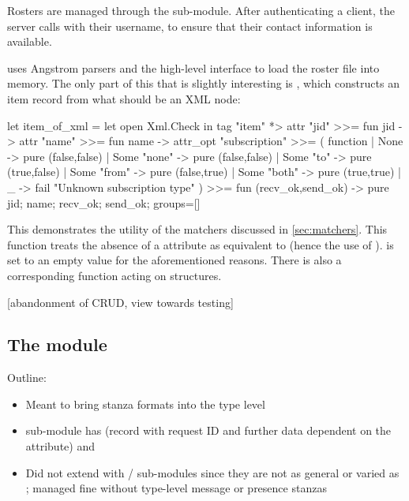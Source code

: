 \documentclass[12pt,a4paper,twoside,openright]{report}
\begin{document}
{Rosters are managed through the  sub-module. After authenticating a client, the server calls  with their username, to ensure that their contact information is available.

 uses Angstrom parsers and the high-level  interface to load the roster file into memory. The only part of this that is slightly interesting is , which constructs an item record from what should be an  XML node:

\begin{ocaml}
let item_of_xml =
  let open Xml.Check in
  tag "item" *> attr "jid" >>= fun jid ->
    attr "name" >>= fun name ->
      attr_opt "subscription" >>= ( function
      | None        -> pure (false,false)
      | Some "none" -> pure (false,false)
      | Some "to"   -> pure (true,false)
      | Some "from" -> pure (false,true)
      | Some "both" -> pure (true,true)
      | _ -> fail "Unknown subscription type" ) >>=
  fun (recv_ok,send_ok) ->
    pure { jid; name; recv_ok; send_ok; groups=[] }
\end{ocaml}

This demonstrates the utility of the  matchers discussed in \ref{sec:matchers}. This function treats the absence of a  attribute as equivalent to  (hence the use of ).  is set to an empty value for the aforementioned reasons. There is also a corresponding  function acting on  structures.

[abandonment of CRUD, view towards testing]

\subsection{The  module}
Outline:

\begin{itemize}
  \item Meant to bring stanza formats into the type level

  \item {} sub-module has  (record with request ID and further data dependent on the  attribute) and 

  \item Did not extend with  /  sub-modules since they are not as general or varied as ; managed fine without type-level message or presence stanzas
\end{itemize}

}
\end{document}
